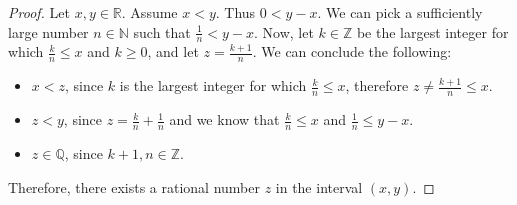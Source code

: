 \documentclass[12pt,oneside]{article}
\newcommand{\R}{\mathbb{R}}
\newcommand{\Z}{\mathbb{Z}}
\newcommand{\Q}{\mathbb{Q}}
\newcommand{\N}{\mathbb{N}}
\begin{document}
\begin{proof}
Let $x,y \in \R$. Assume $x < y$. Thus $0 < y - x$. We can pick a sufficiently large number $n \in \N$ such that $\frac{1}{n} < y - x$. Now, let $k \in \Z$ be the largest integer for which $\frac{k}{n} \leq x$ and $k \geq 0$, and let $z = \frac{k + 1}{n}$. We can conclude the following:
\begin{itemize}
  \item $x < z$, since $k$ is the largest integer for which $\frac{k}{n} \leq x$, therefore $z \not= \frac{k + 1}{n} \leq x$.
  \item $z < y$, since $z = \frac{k}{n} + \frac{1}{n}$ and we know that $\frac{k}{n} \leq x$ and $\frac{1}{n} \leq y - x$.
  \item $z \in \Q$, since $k + 1, n \in \Z$.
\end{itemize}

Therefore, there exists a rational number $z$ in the interval $(x, y)$.
\end{proof}


\end{document}
